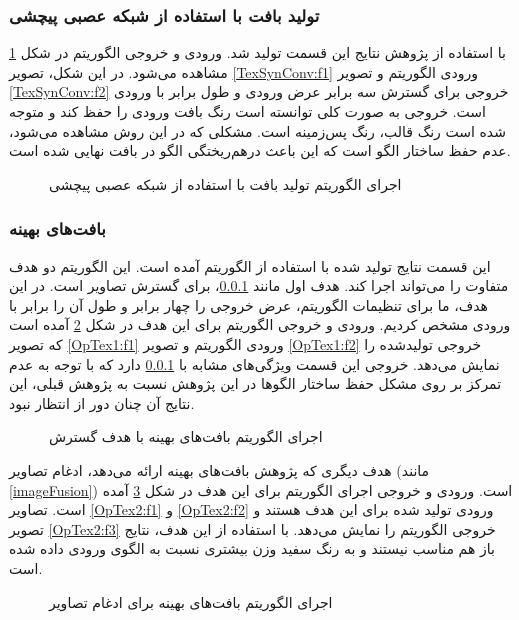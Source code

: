 \subsubsection{تولید بافت با استفاده از شبکه عصبی پیچشی} \label{TexSynConvSec}
با استفاده از پژوهش 
نتایج این قسمت تولید شد. ورودی و خروجی الگوریتم در شکل \ref{TexSynConv} مشاهده می‌شود. در این شکل، تصویر \ref{TexSynConv:f1} ورودی الگوریتم و تصویر \ref{TexSynConv:f2} خروجی برای گسترش سه برابر عرض ورودی و طول برابر با ورودی است. خروجی به صورت کلی توانسته است رنگ بافت ورودی را حفظ کند و متوجه شده است رنگ قالب، رنگ پس‌زمینه است. مشکلی که در این روش مشاهده می‌شود، عدم حفظ ساختار الگو است که این باعث در‌هم‌ریختگی الگو در بافت نهایی شده است.
\begin{figure}[h!]
	\centering
	\qquad
	\caption{اجرای الگوریتم تولید بافت با استفاده از شبکه عصبی پیچشی}
	\label{TexSynConv}
\end{figure}

\subsubsection{بافت‌های بهینه}
این قسمت نتایج تولید شده با استفاده از الگوریتم 
آمده است. این الگوریتم دو هدف متفاوت را می‌تواند اجرا کند. هدف اول مانند \ref{TexSynConvSec}، برای گسترش تصاویر است. در این هدف، ما برای تنظیمات الگوریتم، عرض خروجی را چهار برابر و طول آن را برابر با ورودی مشخص کردیم. ورودی و خروجی الگوریتم برای این هدف در شکل \ref{OpTex1} آمده است که تصویر \ref{OpTex1:f1} ورودی الگوریتم و تصویر \ref{OpTex1:f2} خروجی تولید‌شده را نمایش می‌دهد. خروجی این قسمت ویژگی‌های مشابه با \ref{TexSynConvSec} دارد که با توجه به عدم تمرکز بر روی مشکل حفظ ساختار الگو‌ها در این پژوهش نسبت به پژوهش قبلی، این نتایج آن چنان دور از انتظار نبود.
\begin{figure}[h!]
	\centering
	\qquad
	\caption{اجرای الگوریتم بافت‌های بهینه با هدف گسترش}
	\label{OpTex1}
\end{figure}

هدف دیگری که پژوهش بافت‌های بهینه ارائه می‌دهد، ادغام تصاویر ‌(مانند \ref{imageFusion}) است. ورودی و خروجی اجرای الگوریتم برای این هدف در شکل \ref{OpTex2} آمده است. تصاویر \ref{OpTex2:f1} و \ref{OpTex2:f2} ورودی تولید شده برای این هدف هستند و تصویر \ref{OpTex2:f3} خروجی الگوریتم را نمایش می‌دهد. با استفاده از این هدف، نتایج باز هم مناسب نیستند و به رنگ سفید وزن بیشتری نسبت به الگوی ورودی داده شده است.
\begin{figure}[h!]
	\centering
	\qquad
	\qquad
	\caption{اجرای الگوریتم بافت‌های بهینه برای ادغام تصاویر}
	\label{OpTex2}
\end{figure}

